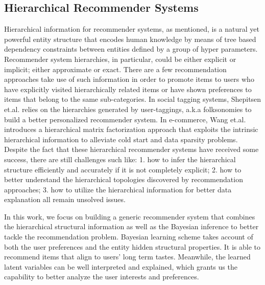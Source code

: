 \subsection{Hierarchical Recommender Systems}

Hierarchical information for recommender systems, as mentioned, is a natural yet powerful entity structure that encodes human knowledge by means of tree based dependency constraints between entities defined by a group of hyper parameters. %
Recommender system hierarchies, in particular, could be either explicit or implicit; either approximate or exact.  There are a few recommendation approaches take use of such information in order to promote items to users who have explicitly visited hierarchically related items or have shown preferences to items that belong to the same sub-categories.  In social tagging systems, Shepitsen et.al. \cite{shepitsen2008personalized} relies on the hierarchies generated by user-taggings, a.k.a folksonomies to build a better personalized recommender system.  In e-commerce, Wang et.al. \cite{wang2018exploring} introduces a hierarchical matrix factorization approach that exploits the intrinsic hierarchical information to alleviate cold start and data sparsity problems.  Despite the fact that these hierarchical recommender systems have received some success, there are still challenges such like: 1. how to infer the hierarchical structure efficiently and accurately if it is not completely explicit; 2. how to better understand the hierarchical topologies discovered by recommendation approaches; 3. how to utilize the hierarchical information for better data explanation all remain unsolved issues.

In this work, we focus on building a generic recommender system that combines the hierarchical structural information as well as the Bayesian inference to better tackle the recommendation problem.  Bayesian learning scheme takes account of both the user preferences and the entity hidden structural properties. It is able to recommend items that align to users' long term tastes.  Meanwhile, the learned latent variables can be well interpreted and explained, which grants us the capability to better analyze the user interests and preferences.